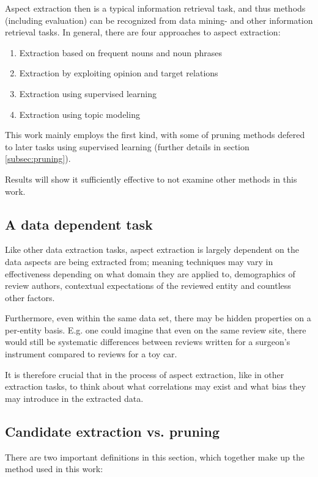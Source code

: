 \documentclass[a4paper,11pt]{kth-mag}
\begin{document}
Aspect extraction then is a typical information retrieval task, and thus methods
(including evaluation) can be recognized from data mining- and other information retrieval tasks.
In general, there are four approaches to aspect extraction\cite[chapter 5.3]{liu2012sentiment}:

\begin{enumerate}
\item Extraction based on frequent nouns and noun phrases
\item Extraction by exploiting opinion and target relations
\item Extraction using supervised learning
\item Extraction using topic modeling
\end{enumerate}
This work mainly employs the first kind, with some of pruning methods defered to
later tasks using supervised learning (further details in section
\ref{subsec:pruning}).

Results will show it sufficiently effective to not examine other methods in
this work.

\subsection{A data dependent task}
Like other data extraction tasks, aspect extraction is largely dependent on the data
aspects are being extracted from; meaning techniques may vary in effectiveness depending
on what domain they are applied to, demographics of review authors,
contextual expectations of the reviewed entity and countless other factors.

Furthermore, even within the same data set, there may be hidden properties on a
per-entity basis. E.g. one could imagine that even on the same review site, there would still
be systematic differences between reviews written for a surgeon's instrument
compared to reviews for a toy car.

It is therefore crucial that in the process of aspect extraction, like in other extraction tasks,
to think about what correlations may exist and what bias they may introduce in the extracted data.


\subsection{Candidate extraction vs. pruning}
There are two important definitions in this section,
which together make up the method used in this work:
\end{document}
